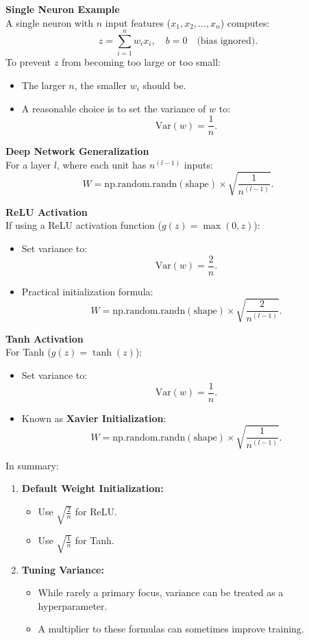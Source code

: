 \documentclass[letterpaper,12pt,notitlepage,twoside]{report}
\begin{document}
\textbf{Single Neuron Example} \\
A single neuron with \( n \) input features (\( x_1, x_2, \dots, x_n \)) computes:
\[
z = \sum_{i=1}^n w_i x_i, \quad b = 0 \quad \text{(bias ignored)}.
\]
To prevent \( z \) from becoming too large or too small:
\begin{itemize}
    \item The larger \( n \), the smaller \( w_i \) should be.
    \item A reasonable choice is to set the variance of \( w \) to:
    \[
    \text{Var}(w) = \frac{1}{n}.
    \]
\end{itemize}

\textbf{Deep Network Generalization} \\
For a layer \( l \), where each unit has \( n^{(l-1)} \) inputs:
\[
W = \text{np.random.randn}(\text{shape}) \times \sqrt{\frac{1}{n^{(l-1)}}}.
\]

\textbf{ReLU Activation} \\
If using a ReLU activation function (\( g(z) = \max(0, z) \)):
\begin{itemize}
    \item Set variance to:
    \[
    \text{Var}(w) = \frac{2}{n}.
    \]
    \item Practical initialization formula:
    \[
    W = \text{np.random.randn}(\text{shape}) \times \sqrt{\frac{2}{n^{(l-1)}}}.
    \]
\end{itemize}

\textbf{Tanh Activation} \\
For Tanh (\( g(z) = \tanh(z) \)):
\begin{itemize}
    \item Set variance to:
    \[
    \text{Var}(w) = \frac{1}{n}.
    \]
    \item Known as \textbf{Xavier Initialization}:
    \[
    W = \text{np.random.randn}(\text{shape}) \times \sqrt{\frac{1}{n^{(l-1)}}}.
    \]
\end{itemize}

In summary: \\
\begin{enumerate}
    \item \textbf{Default Weight Initialization:}
    \begin{itemize}
        \item Use \( \sqrt{\frac{2}{n}} \) for ReLU.
        \item Use \( \sqrt{\frac{1}{n}} \) for Tanh.
    \end{itemize}
    \item \textbf{Tuning Variance:}
    \begin{itemize}
        \item While rarely a primary focus, variance can be treated as a hyperparameter.
        \item A multiplier to these formulas can sometimes improve training.
    \end{itemize}
\end{enumerate}
\end{document}

